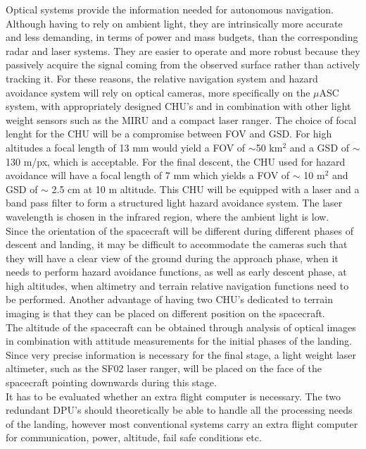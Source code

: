 Optical systems provide the information needed for autonomous navigation. Although having to rely on ambient light, they are intrinsically more accurate and less demanding, in terms of power and mass budgets, than the corresponding radar and laser systems. They are easier to operate and more robust because they passively acquire the signal coming from the observed surface rather than actively tracking it. For these reasons, the relative navigation system and hazard avoidance system will rely on optical cameras, more specifically on the $\mu$ASC system, with appropriately designed CHU's and in combination with other light weight sensors such as the MIRU and a compact laser ranger. The choice of focal lenght for the CHU will be a compromise between FOV and GSD. For high altitudes a focal length of 13 mm would yield a FOV of $\sim$50 km$^2$ and a GSD of $\sim$130 m/px, which is acceptable. For the final descent, the CHU used for hazard avoidance will have a focal length of 7 mm which yields a FOV of $\sim$ 10 m$^2$ and GSD of $\sim$ 2.5 cm at 10 m altitude. This CHU will be equipped with a laser and a band pass filter to form a structured light hazard avoidance system. The laser wavelength is chosen in the infrared region, where the ambient light is low. \\

Since the orientation of the spacecraft will be different during different phases of descent and landing, it may be difficult to accommodate the cameras such that they will have a clear view of the ground during the approach phase, when it needs to perform hazard avoidance functions, as well as early descent phase, at high altitudes, when altimetry and terrain relative navigation functions need to be performed. Another advantage of having two CHU's dedicated to terrain imaging is that they can be placed on different position on the spacecraft.\\

The altitude of the spacecraft can be obtained through analysis of optical images in combination with attitude measurements for the initial phases of the landing. Since very precise information is necessary for the final stage, a light weight laser altimeter, such as the SF02 laser ranger, will be placed on the face of the spacecraft pointing downwards during this stage. \\

It has to be evaluated whether an extra flight computer is necessary. The two redundant DPU's should theoretically be able to handle all the processing needs of the landing, however most conventional systems carry an extra flight computer for communication, power, altitude, fail safe conditions etc.\\

